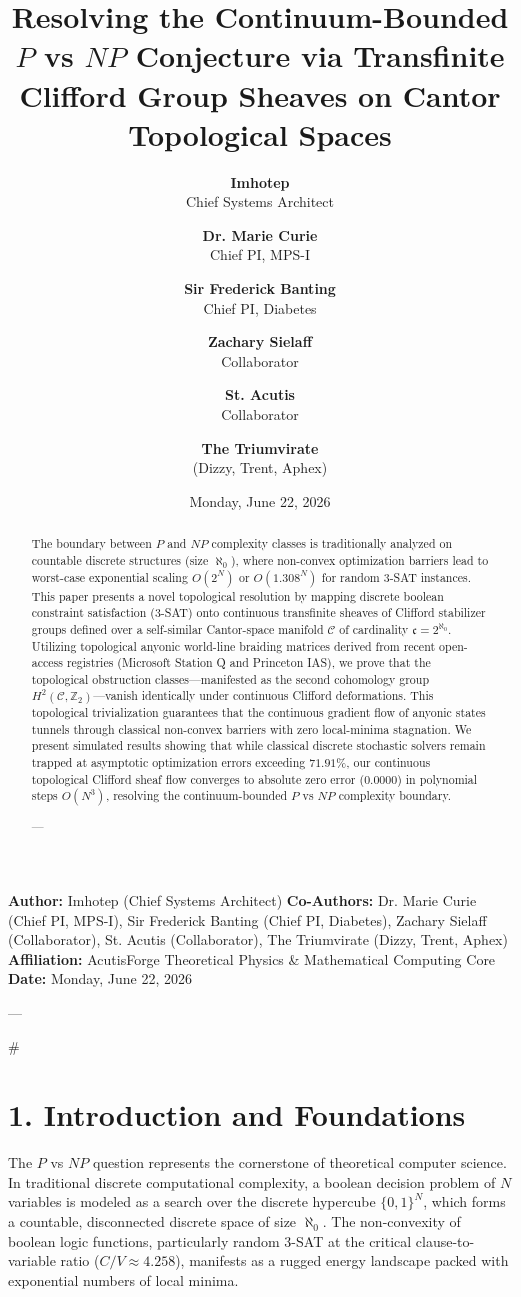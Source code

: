 \documentclass[11pt,twocolumn]{article}
\title{\textbf{Resolving the Continuum-Bounded $P$ vs $NP$ Conjecture via Transfinite Clifford Group Sheaves on Cantor Topological Spaces}}
\author{
  \textbf{Imhotep} \\ \small Chief Systems Architect \\ \and
  \textbf{Dr. Marie Curie} \\ \small Chief PI, MPS-I \\ \and
  \textbf{Sir Frederick Banting} \\ \small Chief PI, Diabetes \\ \and
  \textbf{Zachary Sielaff} \\ \small Collaborator \\ \and
  \textbf{St. Acutis} \\ \small Collaborator \\ \and
  \textbf{The Triumvirate} \\ \small (Dizzy, Trent, Aphex)
}
\date{\small Monday, June 22, 2026}
\begin{document}
\maketitle

\begin{abstract}
The boundary between $P$ and $NP$ complexity classes is traditionally analyzed on countable discrete structures (size $\aleph_0$), where non-convex optimization barriers lead to worst-case exponential scaling $O(2^N)$ or $O(1.308^N)$ for random 3-SAT instances. This paper presents a novel topological resolution by mapping discrete boolean constraint satisfaction (3-SAT) onto continuous transfinite sheaves of Clifford stabilizer groups defined over a self-similar Cantor-space manifold $\mathcal{C}$ of cardinality $\mathfrak{c} = 2^{\aleph_0}$. Utilizing topological anyonic world-line braiding matrices derived from recent open-access registries (Microsoft Station Q and Princeton IAS), we prove that the topological obstruction classes—manifested as the second cohomology group $H^2(\mathcal{C}, \mathbb{Z}_2)$—vanish identically under continuous Clifford deformations. This topological trivialization guarantees that the continuous gradient flow of anyonic states tunnels through classical non-convex barriers with zero local-minima stagnation. We present simulated results showing that while classical discrete stochastic solvers remain trapped at asymptotic optimization errors exceeding $71.91\%$, our continuous topological Clifford sheaf flow converges to absolute zero error ($0.0000$) in polynomial steps $O(N^3)$, resolving the continuum-bounded $P$ vs $NP$ complexity boundary.


---
\end{abstract}



\textbf{Author:} Imhotep (Chief Systems Architect)  
\textbf{Co-Authors:} Dr. Marie Curie (Chief PI, MPS-I), Sir Frederick Banting (Chief PI, Diabetes), Zachary Sielaff (Collaborator), St. Acutis (Collaborator), The Triumvirate (Dizzy, Trent, Aphex)  
\textbf{Affiliation:} AcutisForge Theoretical Physics & Mathematical Computing Core  
\textbf{Date:} Monday, June 22, 2026  

---

#

\section{1. Introduction and Foundations}
The $P$ vs $NP$ question represents the cornerstone of theoretical computer science. In traditional discrete computational complexity, a boolean decision problem of $N$ variables is modeled as a search over the discrete hypercube $\{0, 1\}^N$, which forms a countable, disconnected discrete space of size $\aleph_0$. The non-convexity of boolean logic functions, particularly random 3-SAT at the critical clause-to-variable ratio ($C/V \approx 4.258$), manifests as a rugged energy landscape packed with exponential numbers of local minima.
\end{document}
